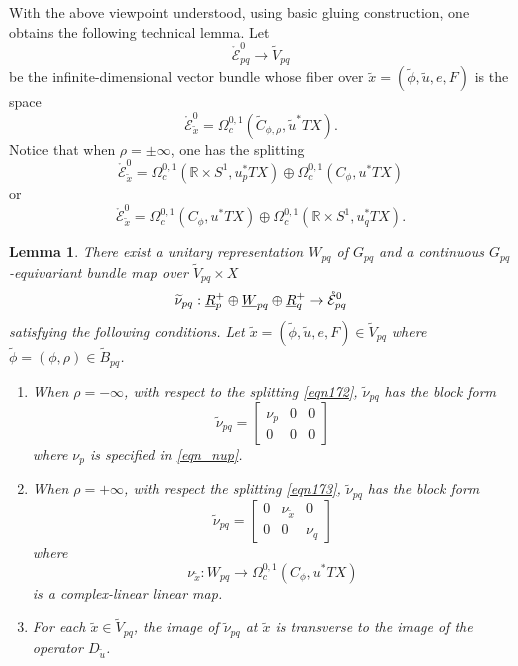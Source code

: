 \documentclass[reqno, 10pt]{amsart}
\numberwithin{equation}{section}
\numberwithin{equation}{section}
\newtheorem{lemma}[thm]{Lemma}
\theoremstyle{definition}
\theoremstyle{remark}
\newcommand{\beq}{\begin{equation}}
\newcommand{\eeq}{\end{equation}}
\newcommand{\beqn}{\begin{equation*}}
\newcommand{\eeqn}{\end{equation*}}
\newcommand{\mb}{\mathbb}
\newcommand{\mc}{\mathcal}
\newcommand{\wt}{\widetilde}
\newcommand{\uds}[1]{\underline{\smash{#1}}}
\begin{document}
With the above viewpoint understood, using basic gluing construction, one obtains the following technical lemma. Let 
\beqn
\mathring {\mc E}_{pq}^0 \to \wt V_{pq}
\eeqn
be the infinite-dimensional vector bundle whose fiber over $\wt x = (\wt \phi, \wt u, e, F)$ is the space
\beqn
\mathring {\mc E}_{\wt x}^0 = \Omega_c^{0,1}( \wt C_{\phi, \rho}, \wt u^* TX).
\eeqn
Notice that when $\rho = \pm \infty$, one has the splitting
\beq\label{eqn172}
\mathring {\mc E}_{\wt x}^0 = \Omega_c^{0,1}( {\mb R}\times S^1, u_p^* TX) \oplus \Omega_c^{0,1}( C_\phi, u^* TX)
\eeq
or
\beq\label{eqn173}
\mathring {\mc E}_{\wt x}^0 = \Omega_c^{0,1}( C_\phi, u^* TX) \oplus \Omega_c^{0,1}({\mb R}\times S^1, u_q^* TX).
\eeq

\begin{lemma}\label{lemma175}
There exist a unitary representation $W_{pq}$ of $G_{pq}$ and a continuous $G_{pq}$-equivariant bundle map over $\wt V_{pq} \times X$
\beqn
\wt\nu_{pq}: \uds R_p^+ \oplus \uds W_{pq} \oplus \uds R_q^+ 
\to \mathring {\mc E}_{pq}^0
\eeqn
satisfying the following conditions. Let $\wt x = (\wt \phi, \wt u, e, F) \in \wt V_{pq}$ where $\wt \phi = (\phi, \rho ) \in \wt B_{pq}$.
\begin{enumerate}

    \item When $\rho = -\infty$, with respect to the splitting \eqref{eqn172}, $\wt\nu_{pq}$ has the block form
    \beqn
    \wt \nu_{pq} = \left[ \begin{array}{ccc} \nu_p &  0 & 0 \\
                     0 & 0 & 0 \end{array}\right]
    \eeqn
    where $\nu_p$ is specified in \eqref{eqn_nup}.
    
    \item When $\rho = +\infty$, with respect the splitting \eqref{eqn173}, $\wt\nu_{pq}$ has the block form
    \beqn
    \wt\nu_{pq} = \left[ \begin{array}{ccc} 0 &  \nu_{\wt x} & 0 \\
     0 & 0 &  \nu_q \end{array}\right]
     \eeqn
     where
    \beqn
    \nu_{\wt x}: W_{pq} \to \Omega_c^{0,1}(C_\phi, u^* TX)
    \eeqn
    is a complex-linear linear map.
    
    \item For each $\wt x \in \wt V_{pq}$, the image of $\wt\nu_{pq}$ at $\wt x$ is transverse to the image of the operator $D_{\wt u}$. 
\end{enumerate}
\end{lemma}
\end{document}
